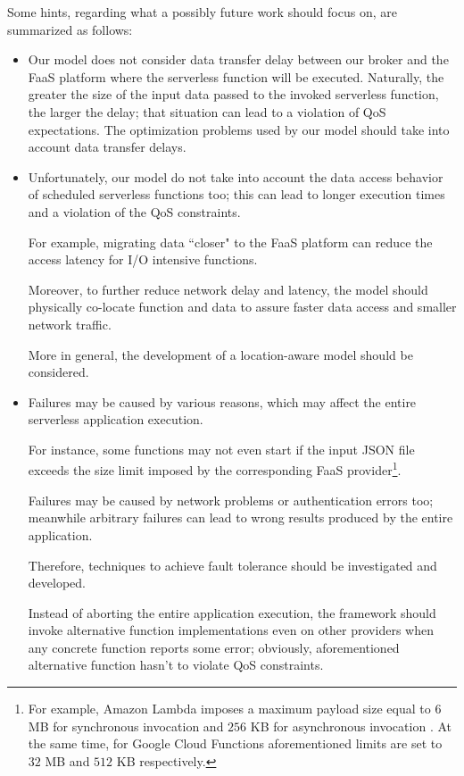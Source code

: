 \documentclass[12pt,a4paper]{report}
\newcommand{\QuoteIntro}{``}
\begin{document}
Some hints, regarding what a possibly future work should focus on, are summarized as follows:

\begin{itemize}
	
	\item Our model does not consider data transfer delay between our broker and the FaaS platform where the serverless function will be executed. Naturally, the greater the size of the input data passed to the invoked serverless function, the larger the delay; that situation can lead to a violation of QoS expectations. The optimization problems used by our model should take into account data transfer delays.
	
	\item Unfortunately, our model do not take into account the data access behavior of scheduled serverless functions too; this can lead to longer execution times and a violation of the QoS constraints. 
	
	For example, migrating data \QuoteIntro closer" to the FaaS platform can  reduce the access latency for I/O intensive functions. 
	
	Moreover, to further reduce network delay and latency, the model should physically co-locate function and data to assure faster data access and smaller network traffic.
	
	More in general, the development of a location-aware model should be considered.
	 
	\item Failures may be caused by various reasons, which may affect the entire serverless application execution. 
	
	For instance, some functions may not even start if the input JSON file exceeds the size limit imposed by the corresponding FaaS provider\footnote{For example, Amazon Lambda imposes a maximum payload size equal to $6$ MB for synchronous invocation and $256$ KB for asynchronous invocation \cite{Lambdaquotas}. At the same time, for Google Cloud Functions aforementioned limits are set to $32$ MB and $512$ KB respectively.\cite{Googlequotas}}. 
	
	Failures may be caused by network problems or authentication errors too; meanwhile arbitrary failures can lead to wrong results produced by the entire application.
	
	Therefore, techniques to achieve fault tolerance should be investigated and developed. 
	
	Instead of aborting the entire application execution, the framework should invoke alternative function implementations even on other providers when any concrete function reports some error; obviously, aforementioned alternative function hasn't to violate QoS constraints. 


\end{itemize}
\end{document}

